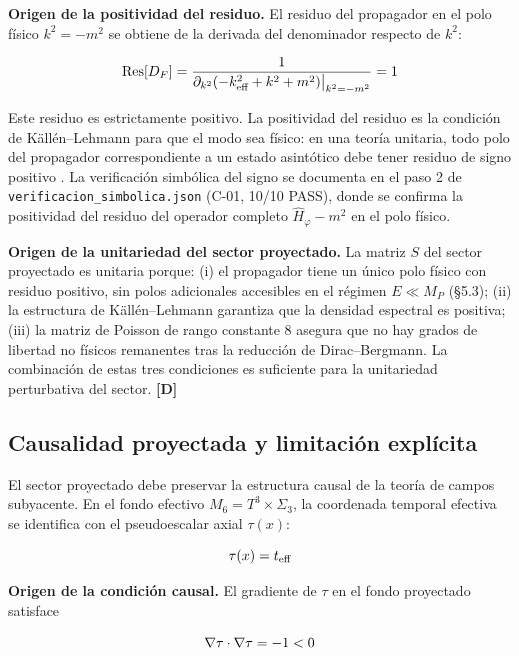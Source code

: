 ﻿\documentclass[11pt,letterpaper]{article}
\begin{document}
\textbf{Origen de la positividad del residuo.} El residuo del propagador en el polo físico $k^2 = -m^2$ se obtiene de la derivada del denominador respecto de $k^2$:

\begin{equation*}
  \resizebox{\ifdim\width>\linewidth \linewidth\else\width\fi}{!}{$\displaystyle \mathrm{Res}[D_F] = \frac{1}{\partial_{k^2}(-k_{\text{eff}}^2 + k^2 + m^2)\big|_{k^2 = -m^2}} = 1$}
\end{equation*}

Este residuo es estrictamente positivo. La positividad del residuo es la condición de Källén--Lehmann para que el modo sea físico: en una teoría unitaria, todo polo del propagador correspondiente a un estado asintótico debe tener residuo de signo positivo \cite{Kallen1952,Lehmann1954}. La verificación simbólica del signo se documenta en el paso 2 de \texttt{verificacion\_simbolica.json} (C-01, 10/10 PASS), donde se confirma la positividad del residuo del operador completo $\hat{H}_\varphi - m^2$ en el polo físico.

\textbf{Origen de la unitariedad del sector proyectado.} La matriz $S$ del sector proyectado es unitaria porque: (i) el propagador tiene un único polo físico con residuo positivo, sin polos adicionales accesibles en el régimen $E \ll M_P$ (§5.3); (ii) la estructura de Källén--Lehmann garantiza que la densidad espectral es positiva; (iii) la matriz de Poisson de rango constante $8$ asegura que no hay grados de libertad no físicos remanentes tras la reducción de Dirac--Bergmann. La combinación de estas tres condiciones es suficiente para la unitariedad perturbativa del sector. \textbf{[D]}
\subsection{Causalidad proyectada y limitación explícita}
El sector proyectado debe preservar la estructura causal de la teoría de campos subyacente. En el fondo efectivo $M_6 = T^3 \times \Sigma_3$, la coordenada temporal efectiva se identifica con el pseudoescalar axial $\tau(x)$:

\begin{equation*}
  \resizebox{\ifdim\width>\linewidth \linewidth\else\width\fi}{!}{$\displaystyle \tau(x) = t_{\text{eff}}$}
\end{equation*}

\textbf{Origen de la condición causal.} El gradiente de $\tau$ en el fondo proyectado satisface

\begin{equation*}
  \resizebox{\ifdim\width>\linewidth \linewidth\else\width\fi}{!}{$\displaystyle \nabla\tau \cdot \nabla\tau = -1 < 0$}
\end{equation*}
\end{document}

